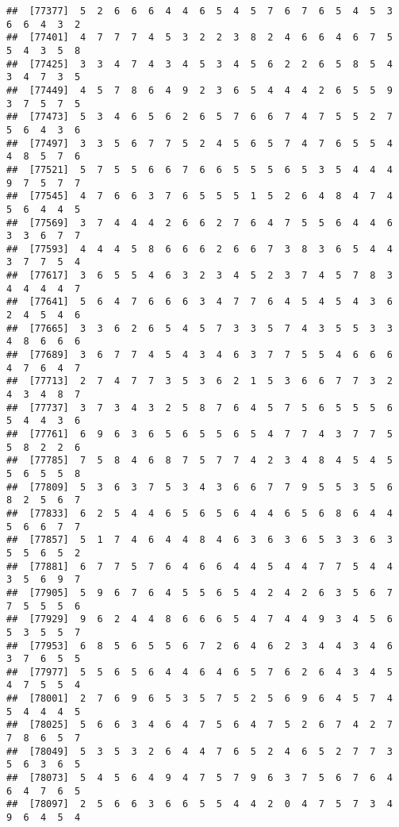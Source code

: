 \documentclass[
]{book}
\begin{document}
\begin{verbatim}
##  [77377]  5  2  6  6  6  4  4  6  5  4  5  7  6  7  6  5  4  5  3  6  6  4  3  2
##  [77401]  4  7  7  7  4  5  3  2  2  3  8  2  4  6  6  4  6  7  5  5  4  3  5  8
##  [77425]  3  3  4  7  4  3  4  5  3  4  5  6  2  2  6  5  8  5  4  3  4  7  3  5
##  [77449]  4  5  7  8  6  4  9  2  3  6  5  4  4  4  2  6  5  5  9  3  7  5  7  5
##  [77473]  5  3  4  6  5  6  2  6  5  7  6  6  7  4  7  5  5  2  7  5  6  4  3  6
##  [77497]  3  3  5  6  7  7  5  2  4  5  6  5  7  4  7  6  5  5  4  4  8  5  7  6
##  [77521]  5  7  5  5  6  6  7  6  6  5  5  5  6  5  3  5  4  4  4  9  7  5  7  7
##  [77545]  4  7  6  6  3  7  6  5  5  5  1  5  2  6  4  8  4  7  4  5  6  4  4  5
##  [77569]  3  7  4  4  4  2  6  6  2  7  6  4  7  5  5  6  4  4  6  3  3  6  7  7
##  [77593]  4  4  4  5  8  6  6  6  2  6  6  7  3  8  3  6  5  4  4  3  7  7  5  4
##  [77617]  3  6  5  5  4  6  3  2  3  4  5  2  3  7  4  5  7  8  3  4  4  4  4  7
##  [77641]  5  6  4  7  6  6  6  3  4  7  7  6  4  5  4  5  4  3  6  2  4  5  4  6
##  [77665]  3  3  6  2  6  5  4  5  7  3  3  5  7  4  3  5  5  3  3  4  8  6  6  6
##  [77689]  3  6  7  7  4  5  4  3  4  6  3  7  7  5  5  4  6  6  6  4  7  6  4  7
##  [77713]  2  7  4  7  7  3  5  3  6  2  1  5  3  6  6  7  7  3  2  4  3  4  8  7
##  [77737]  3  7  3  4  3  2  5  8  7  6  4  5  7  5  6  5  5  5  6  5  4  4  3  6
##  [77761]  6  9  6  3  6  5  6  5  5  6  5  4  7  7  4  3  7  7  5  5  8  2  2  6
##  [77785]  7  5  8  4  6  8  7  5  7  7  4  2  3  4  8  4  5  4  5  5  6  5  5  8
##  [77809]  5  3  6  3  7  5  3  4  3  6  6  7  7  9  5  5  3  5  6  8  2  5  6  7
##  [77833]  6  2  5  4  4  6  5  6  5  6  4  4  6  5  6  8  6  4  4  5  6  6  7  7
##  [77857]  5  1  7  4  6  4  4  8  4  6  3  6  3  6  5  3  3  6  3  5  5  6  5  2
##  [77881]  6  7  7  5  7  6  4  6  6  4  4  5  4  4  7  7  5  4  4  3  5  6  9  7
##  [77905]  5  9  6  7  6  4  5  5  6  5  4  2  4  2  6  3  5  6  7  7  5  5  5  6
##  [77929]  9  6  2  4  4  8  6  6  6  5  4  7  4  4  9  3  4  5  6  5  3  5  5  7
##  [77953]  6  8  5  6  5  5  6  7  2  6  4  6  2  3  4  4  3  4  6  3  7  6  5  5
##  [77977]  5  5  6  5  6  4  4  6  4  6  5  7  6  2  6  4  3  4  5  4  7  5  5  4
##  [78001]  2  7  6  9  6  5  3  5  7  5  2  5  6  9  6  4  5  7  4  5  4  4  4  5
##  [78025]  5  6  6  3  4  6  4  7  5  6  4  7  5  2  6  7  4  2  7  7  8  6  5  7
##  [78049]  5  3  5  3  2  6  4  4  7  6  5  2  4  6  5  2  7  7  3  5  6  3  6  5
##  [78073]  5  4  5  6  4  9  4  7  5  7  9  6  3  7  5  6  7  6  4  6  4  7  6  5
##  [78097]  2  5  6  6  3  6  6  5  5  4  4  2  0  4  7  5  7  3  4  9  6  4  5  4

\end{verbatim}
\end{document}
